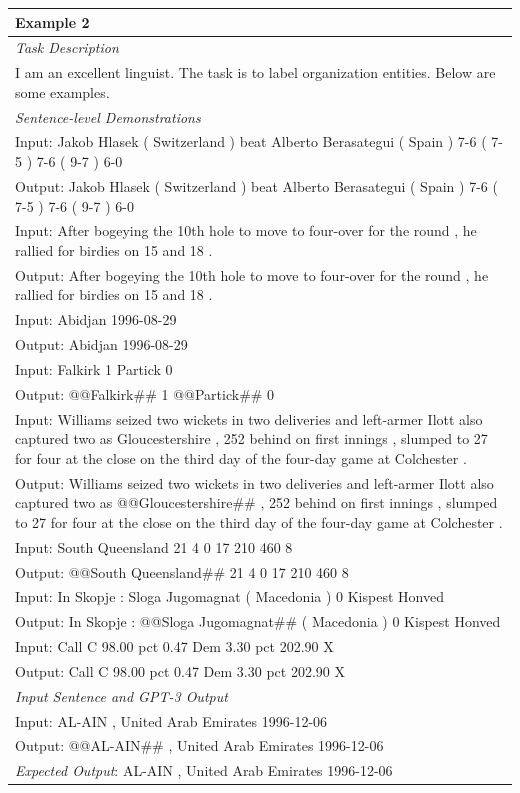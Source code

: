 \documentclass[11pt]{article}
\begin{document}
\begin{table}[th!]
{\begin{tabular}{l}
\textbf{Example 2} \\\midrule
       	\textit{Task Description} \\
I am an excellent linguist. The task is to label organization entities. Below are some examples. \\\midrule
\textit{Sentence-level Demonstrations} \\
Input: Jakob Hlasek ( Switzerland ) beat Alberto Berasategui ( Spain ) 7-6 ( 7-5 ) 7-6 ( 9-7 ) 6-0 \\
Output: Jakob Hlasek ( Switzerland ) beat Alberto Berasategui ( Spain ) 7-6 ( 7-5 ) 7-6 ( 9-7 ) 6-0 \\
Input: After bogeying the 10th hole to move to four-over for the round , he rallied for birdies on 15 and 18 . \\
Output: After bogeying the 10th hole to move to four-over for the round , he rallied for birdies on 15 and 18 . \\
Input: Abidjan 1996-08-29 \\
Output: Abidjan 1996-08-29 \\
Input: Falkirk 1 Partick 0 \\
Output: @@Falkirk\#\# 1 @@Partick\#\# 0 \\
Input: Williams seized two wickets in two deliveries and left-armer Ilott also captured two as Gloucestershire , 252 behind on first innings , slumped to 27 for four at the close on the third day of the four-day game at Colchester . \\
Output: Williams seized two wickets in two deliveries and left-armer Ilott also captured two as @@Gloucestershire\#\# , 252 behind on first innings , slumped to 27 for four at the close on the third day of the four-day game at Colchester . \\
Input: South Queensland 21 4 0 17 210 460 8 \\
Output: @@South Queensland\#\# 21 4 0 17 210 460 8 \\
Input: In Skopje : Sloga Jugomagnat ( Macedonia ) 0 Kispest Honved \\
Output: In Skopje : @@Sloga Jugomagnat\#\# ( Macedonia ) 0 Kispest Honved \\
Input: Call C 98.00 pct 0.47 Dem 3.30 pct 202.90 X \\
Output: Call C 98.00 pct 0.47 Dem 3.30 pct 202.90 X \\\midrule
\textit{Input Sentence and GPT-3 Output} \\
Input: AL-AIN , United Arab Emirates 1996-12-06 \\
Output: @@AL-AIN\#\# , United Arab Emirates 1996-12-06 \\
{\color{blue}\it Expected Output}: AL-AIN , United Arab Emirates 1996-12-06 \\\bottomrule


\end{tabular}}
\end{table}
\end{document}
